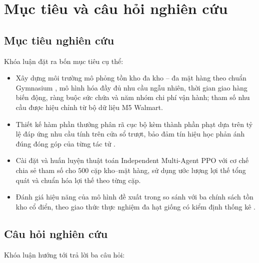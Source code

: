 \section{Mục tiêu và câu hỏi nghiên cứu}
\label{sec:muctieu}

\subsection{Mục tiêu nghiên cứu}
\label{subsec:muctieu}

Khóa luận đặt ra bốn mục tiêu cụ thể:

\begin{itemize}
    \item Xây dựng môi trường mô phỏng tồn kho đa kho -- đa mặt hàng theo chuẩn
    Gymnasium \parencite{towers2024gymnasium}, mô hình hóa đầy đủ nhu cầu ngẫu
    nhiên, thời gian giao hàng biến động, ràng buộc sức chứa và năm nhóm chi phí
    vận hành; tham số nhu cầu được hiệu chỉnh từ bộ dữ liệu M5 Walmart.

    \item Thiết kế hàm phần thưởng phân rã cục bộ kèm thành phần phạt dựa trên
    tỷ lệ đáp ứng nhu cầu tính trên cửa sổ trượt, bảo đảm tín hiệu học phản ánh
    đúng đóng góp của từng tác tử \parencite{wolpert2001}.

    \item Cài đặt và huấn luyện thuật toán Independent Multi-Agent PPO
    \parencite{schulman2017ppo, dewitt2020ippo} với cơ chế chia sẻ tham số cho
    $500$ cặp kho--mặt hàng, sử dụng ước lượng lợi thế tổng quát
    \parencite{schulman2016gae} và chuẩn hóa lợi thế theo từng cặp.

    \item Đánh giá hiệu năng của mô hình đề xuất trong so sánh với ba chính
    sách tồn kho cổ điển, theo giao thức thực nghiệm đa hạt giống có kiểm định
    thống kê \parencite{henderson2018, agarwal2021}.
\end{itemize}

\subsection{Câu hỏi nghiên cứu}
\label{subsec:cauhoi}

Khóa luận hướng tới trả lời ba câu hỏi:

